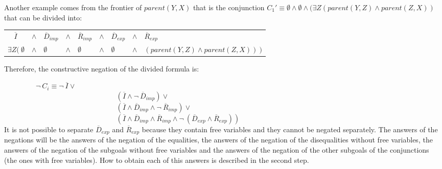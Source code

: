 \documentclass{tlp}
\begin{document}
Another example comes from the frontier of $parent(Y,X)$ that is the
conjunction $C_1' \equiv \emptyset \wedge \emptyset \wedge (\exists Z
(parent(Y,Z) \wedge parent(Z,X) )$ that can be divided into:
\begin{center}
\begin{tabular}{lllllllll}
$~~~~\overline{I}$ & $ \wedge$ &
        $\overline{D}_{imp}$ & $ \wedge$ & $ \overline{R}_{imp}$ &
        $\wedge$ & $\overline{D}_{exp}$ & $ \wedge$ & $ \overline{R}_{exp}$  \\
        $\exists Z (~ \emptyset$ & $ \wedge$ & $ \emptyset$ & $ \wedge$ & 
$\emptyset$ & $ \wedge$ & $ \emptyset$ & $ \wedge $ & $ (parent(Y,Z) \wedge parent(Z,X) ) ~)$ 
\end{tabular}
\end{center}


Therefore, the constructive negation of the divided formula is:

\noindent
$~~~~~~~~~~~~~~~~~~~~\neg~C_i \equiv \neg~\overline{I} \vee $ \\
$~~~~~~~~~~~~~~~~~~~~~~~~~~~~~~~~~~~~ ~~~~~~~~~~~~~~~~~~~~~~~~~~~~~~~~~~~(\overline{I} \wedge \neg~\overline{D}_{imp}) \vee  $ \\
$~~~~~~~~~~~~~~~~~~~~~~~~~~~~~~~~~~~~ ~~~~~~~~~~~~~~~~~~~~~~~~~~~~~~~~~~~(\overline{I} \wedge \overline{D}_{imp}  \wedge \neg~\overline{R}_{imp}) \vee $ \\
$~~~~~~~~~~~~~~~~~~~~~~~~~~~~~~~~~~~~ ~~~~~~~~~~~~~~~~~~~~~~~~~~~~~~~~~~~( \overline{I} \wedge \overline{D}_{imp} \wedge \overline{R}_{imp} \wedge \neg~(\overline{D}_{exp} \wedge \overline{R}_{exp})) $ \\


It is not possible to separate $\overline{D}_{exp}$ and
$\overline{R}_{exp}$ because they contain free variables and
they cannot be negated separately. The answers of the negations
will be the answers of the negation of the equalities, the answers of
the negation of the disequalities without free variables, the answers
of the negation of the subgoals without free variables and the answers
of the negation of the other subgoals of the conjunctions (the ones
with free variables). How to obtain each of this answers is described in the
second step.
\end{document}
